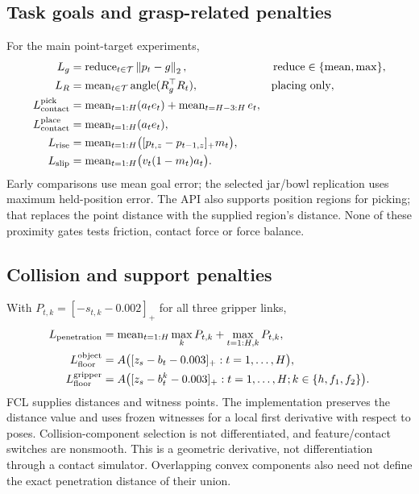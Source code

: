 \documentclass[10pt]{article}
\newcommand{\norm}[1]{\left\lVert#1\right\rVert}
\newcommand{\mean}{\operatorname{mean}}
\begin{document}
\subsection{Task goals and grasp-related penalties}
For the main point-target experiments,
\begin{align}
 L_g&=\operatorname{reduce}_{t\in\mathcal T}\norm{p_t-g}_2,
 &&\operatorname{reduce}\in\{\mean,\max\},\\
 L_R&=\mean_{t\in\mathcal T}\operatorname{angle}(R_g^\top R_t),
 &&\text{placing only},\\
 L_{\rm contact}^{\rm pick}
 &=\mean_{t=1:H}(a_te_t)+\mean_{t=H-3:H}e_t,\\
 L_{\rm contact}^{\rm place}&=\mean_{t=1:H}(a_te_t),\\
 L_{\rm rise}&=\mean_{t=1:H}\bigl([p_{t,z}-p_{t-1,z}]_+m_t\bigr),\\
 L_{\rm slip}&=\mean_{t=1:H}\bigl(v_t(1-m_t)a_t\bigr).
\end{align}
Early comparisons use mean goal error; the selected jar/bowl replication uses
maximum held-position error. The API also supports position regions for
picking; that replaces the point distance with the supplied region's distance.
None of these proximity gates tests friction, contact force or force balance.

\subsection{Collision and support penalties}
With $P_{t,k}=[-s_{t,k}-0.002]_+$ for all three gripper links,
\begin{align}
 L_{\rm penetration}&=\mean_{t=1:H}\max_k P_{t,k}
                       +\max_{t=1:H,k}P_{t,k},\\
 L_{\rm floor}^{\rm object}&=A\bigl([z_s-b_t-0.003]_+:t=1,\ldots,H\bigr),\\
 L_{\rm floor}^{\rm gripper}&=A\bigl([z_s-b^k_t-0.003]_+:t=1,\ldots,H;
                                  k\in\{h,f_1,f_2\}\bigr).
\end{align}
FCL supplies distances and witness points. The implementation preserves the
distance value and uses frozen witnesses for a local first derivative with
respect to poses. Collision-component selection is not differentiated, and
feature/contact switches are nonsmooth. This is a geometric derivative, not
differentiation through a contact simulator. Overlapping convex components
also need not define the exact penetration distance of their union.

\clearpage
\end{document}
